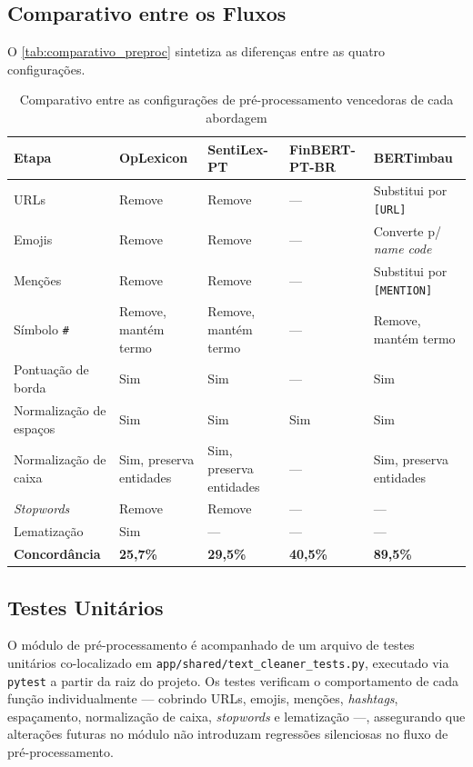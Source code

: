 \subsection{Comparativo entre os Fluxos}
\label{subsec:comparativo_preproc}

O \autoref{tab:comparativo_preproc} sintetiza as diferenças entre as quatro configurações.

\begin{table}[!htbp]
	\caption{Comparativo entre as configurações de pré-processamento vencedoras de cada abordagem}
	\label{tab:comparativo_preproc}
	\begin{tabular}{p{2.6cm}p{2.9cm}p{2.9cm}p{2.3cm}p{2.9cm}}
		\hline
		\textbf{Etapa} & \textbf{OpLexicon} & \textbf{SentiLex-PT} & \textbf{FinBERT-PT-BR} & \textbf{BERTimbau} \\
		\hline
		URLs & Remove & Remove & --- & Substitui por \texttt{[URL]} \\
		\hline
		Emojis & Remove & Remove & --- & Converte p/ \textit{name code} \\
		\hline
		Menções & Remove & Remove & --- & Substitui por \texttt{[MENTION]} \\
		\hline
		Símbolo \texttt{\#} & Remove, mantém termo & Remove, mantém termo & --- & Remove, mantém termo \\
		\hline
		Pontuação de borda & Sim & Sim & --- & Sim \\
		\hline
		Normalização de espaços & Sim & Sim & Sim & Sim \\
		\hline
		Normalização de caixa & Sim, preserva entidades & Sim, preserva entidades & --- & Sim, preserva entidades \\
		\hline
		\textit{Stopwords} & Remove & Remove & --- & --- \\
		\hline
		Lematização & Sim & --- & --- & --- \\
		\hline
		\textbf{Concordância} & \textbf{25,7\%} & \textbf{29,5\%} & \textbf{40,5\%} & \textbf{89,5\%} \\
		\hline
	\end{tabular}
\end{table}	
	
	
\subsection{Testes Unitários}
\label{subsec:testes_preprocessamento}

O módulo de pré-processamento é acompanhado de um arquivo de testes unitários co-localizado em \texttt{app/shared/text\_cleaner\_tests.py}, executado via \texttt{pytest} a partir da raiz do projeto. Os testes verificam o comportamento de cada função individualmente — cobrindo URLs, emojis, menções, \textit{hashtags}, espaçamento, normalização de caixa, \textit{stopwords} e lematização —, assegurando que alterações futuras no módulo não introduzam regressões silenciosas no fluxo de
pré-processamento.